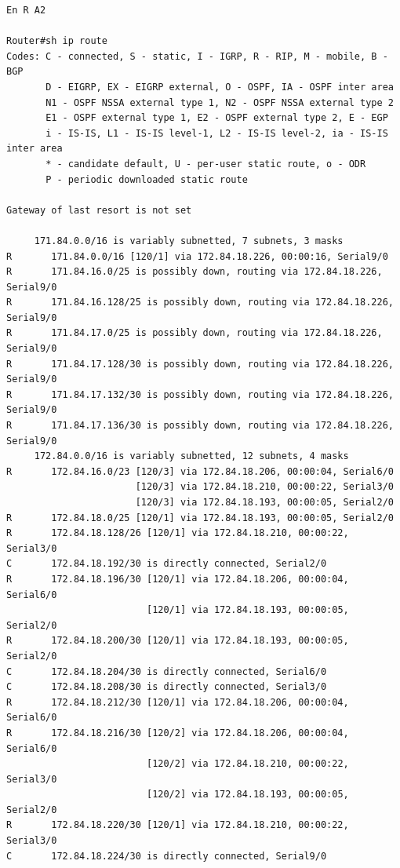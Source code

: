 \documentclass[twoside, 11pt]{article}
\begin{document}
\begin{enumerate}
\begin{center}
\begin{verbatim}
En R A2

Router#sh ip route 
Codes: C - connected, S - static, I - IGRP, R - RIP, M - mobile, B - BGP
       D - EIGRP, EX - EIGRP external, O - OSPF, IA - OSPF inter area
       N1 - OSPF NSSA external type 1, N2 - OSPF NSSA external type 2
       E1 - OSPF external type 1, E2 - OSPF external type 2, E - EGP
       i - IS-IS, L1 - IS-IS level-1, L2 - IS-IS level-2, ia - IS-IS inter area
       * - candidate default, U - per-user static route, o - ODR
       P - periodic downloaded static route

Gateway of last resort is not set

     171.84.0.0/16 is variably subnetted, 7 subnets, 3 masks
R       171.84.0.0/16 [120/1] via 172.84.18.226, 00:00:16, Serial9/0
R       171.84.16.0/25 is possibly down, routing via 172.84.18.226, Serial9/0
R       171.84.16.128/25 is possibly down, routing via 172.84.18.226, Serial9/0
R       171.84.17.0/25 is possibly down, routing via 172.84.18.226, Serial9/0
R       171.84.17.128/30 is possibly down, routing via 172.84.18.226, Serial9/0
R       171.84.17.132/30 is possibly down, routing via 172.84.18.226, Serial9/0
R       171.84.17.136/30 is possibly down, routing via 172.84.18.226, Serial9/0
     172.84.0.0/16 is variably subnetted, 12 subnets, 4 masks
R       172.84.16.0/23 [120/3] via 172.84.18.206, 00:00:04, Serial6/0
                       [120/3] via 172.84.18.210, 00:00:22, Serial3/0
                       [120/3] via 172.84.18.193, 00:00:05, Serial2/0
R       172.84.18.0/25 [120/1] via 172.84.18.193, 00:00:05, Serial2/0
R       172.84.18.128/26 [120/1] via 172.84.18.210, 00:00:22, Serial3/0
C       172.84.18.192/30 is directly connected, Serial2/0
R       172.84.18.196/30 [120/1] via 172.84.18.206, 00:00:04, Serial6/0
                         [120/1] via 172.84.18.193, 00:00:05, Serial2/0
R       172.84.18.200/30 [120/1] via 172.84.18.193, 00:00:05, Serial2/0
C       172.84.18.204/30 is directly connected, Serial6/0
C       172.84.18.208/30 is directly connected, Serial3/0
R       172.84.18.212/30 [120/1] via 172.84.18.206, 00:00:04, Serial6/0
R       172.84.18.216/30 [120/2] via 172.84.18.206, 00:00:04, Serial6/0
                         [120/2] via 172.84.18.210, 00:00:22, Serial3/0
                         [120/2] via 172.84.18.193, 00:00:05, Serial2/0
R       172.84.18.220/30 [120/1] via 172.84.18.210, 00:00:22, Serial3/0
C       172.84.18.224/30 is directly connected, Serial9/0
\end{verbatim}
\label{list:2.2.1.3}
\end{center}


\end{enumerate}
\end{document}
